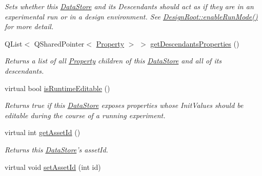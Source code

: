 \begin{DoxyCompactItemize}
\begin{DoxyCompactList}\small\item\em Sets whether this \hyperlink{class_picto_1_1_data_store}{Data\-Store} and its Descendants should act as if they are in an experimental run or in a design environment.  See \hyperlink{class_picto_1_1_design_root_a602921939c89f471772431dae8c3281a}{Design\-Root\-::enable\-Run\-Mode()} for more detail. \end{DoxyCompactList}\item 
Q\-List$<$ Q\-Shared\-Pointer$<$ \hyperlink{class_picto_1_1_property}{Property} $>$ $>$ \hyperlink{class_picto_1_1_data_store_ae941b69a8bad6364b6020a2315271833}{get\-Descendants\-Properties} ()
\begin{DoxyCompactList}\small\item\em Returns a list of all \hyperlink{class_picto_1_1_property}{Property} children of this \hyperlink{class_picto_1_1_data_store}{Data\-Store} and all of its descendants. \end{DoxyCompactList}\item 
virtual bool \hyperlink{class_picto_1_1_data_store_a9b4845846d4abcd842d01f8fad16e85b}{is\-Runtime\-Editable} ()
\begin{DoxyCompactList}\small\item\em Returns true if this \hyperlink{class_picto_1_1_data_store}{Data\-Store} exposes properties whose Init\-Values should be editable during the course of a running experiment. \end{DoxyCompactList}\item 
\hypertarget{class_picto_1_1_data_store_a11656f0aa7242846c3119037aab91674}{virtual int \hyperlink{class_picto_1_1_data_store_a11656f0aa7242846c3119037aab91674}{get\-Asset\-Id} ()}\label{class_picto_1_1_data_store_a11656f0aa7242846c3119037aab91674}

\begin{DoxyCompactList}\small\item\em Returns this \hyperlink{class_picto_1_1_data_store}{Data\-Store}'s asset\-Id. \end{DoxyCompactList}\item 
\hypertarget{class_picto_1_1_data_store_afc91c6a4c8d69bc3b3b8ef3be9bb761c}{virtual void \hyperlink{class_picto_1_1_data_store_afc91c6a4c8d69bc3b3b8ef3be9bb761c}{set\-Asset\-Id} (int id)}\label{class_picto_1_1_data_store_afc91c6a4c8d69bc3b3b8ef3be9bb761c}


\end{DoxyCompactItemize}

